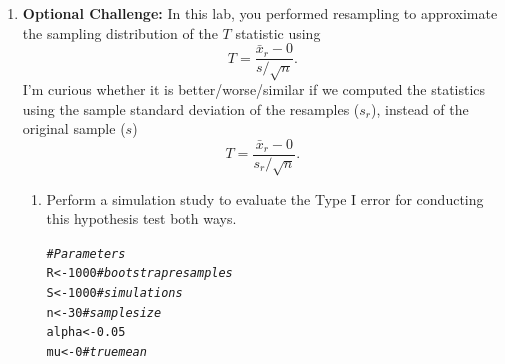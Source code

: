 \documentclass{article}\usepackage[]{graphicx}\usepackage[]{xcolor}
\makeatletter
\newcommand{\hlnum}[1]{\textcolor[rgb]{0.686,0.059,0.569}{#1}}%
\newcommand{\hlsng}[1]{\textcolor[rgb]{0.192,0.494,0.8}{#1}}%
\newcommand{\hlcom}[1]{\textcolor[rgb]{0.678,0.584,0.686}{\textit{#1}}}%
\newcommand{\hldef}[1]{\textcolor[rgb]{0.345,0.345,0.345}{#1}}%
\newcommand{\hlkwb}[1]{\textcolor[rgb]{0.69,0.353,0.396}{#1}}%
\newcommand{\hlkwd}[1]{\textcolor[rgb]{0.737,0.353,0.396}{\textbf{#1}}}%
\newenvironment{kframe}{%
 \def\at@end@of@kframe{}%
 \ifinner\ifhmode%
  \def\at@end@of@kframe{\end{minipage}}%
  \begin{minipage}{\columnwidth}%
 \fi\fi%
 \def\FrameCommand##1{\hskip\@totalleftmargin \hskip-\fboxsep
 \colorbox{shadecolor}{##1}\hskip-\fboxsep
     \hskip-\linewidth \hskip-\@totalleftmargin \hskip\columnwidth}%
 \MakeFramed {\advance\hsize-\width
   \@totalleftmargin\z@ \linewidth\hsize
   \@setminipage}}%
 {\par\unskip\endMakeFramed%
 \at@end@of@kframe}
\newenvironment{knitrout}{}{} %
\makeatother
\begin{document}
\begin{enumerate}
\item \textbf{Optional Challenge:} In this lab, you performed resampling to 
approximate the sampling distribution of the $T$ statistic using
\[T = \frac{\bar{x}_r - 0}{s/\sqrt{n}}.\]
I'm curious whether it is better/worse/similar if we computed the statistics
using the sample standard deviation of the resamples ($s_r$), instead of the 
original sample ($s$)
  \[T = \frac{\bar{x}_r - 0}{s_r/\sqrt{n}}.\]
\begin{enumerate}
  \item Perform a simulation study to evaluate the Type I error for conducting this
hypothesis test both ways.
\begin{knitrout}
\color{fgcolor}\begin{kframe}
\begin{alltt}
\hlcom{# Parameters}
\hldef{R} \hlkwb{<-} \hlnum{1000}   \hlcom{# bootstrap resamples}
\hldef{S} \hlkwb{<-} \hlnum{1000}   \hlcom{# simulations}
\hldef{n} \hlkwb{<-} \hlnum{30}     \hlcom{# sample size}
\hldef{alpha} \hlkwb{<-} \hlnum{0.05}
\hldef{mu} \hlkwb{<-} \hlnum{0}     \hlcom{# true mean}


\end{alltt}
\end{kframe}
\end{knitrout}
\end{enumerate}
\end{enumerate}
\end{document}
